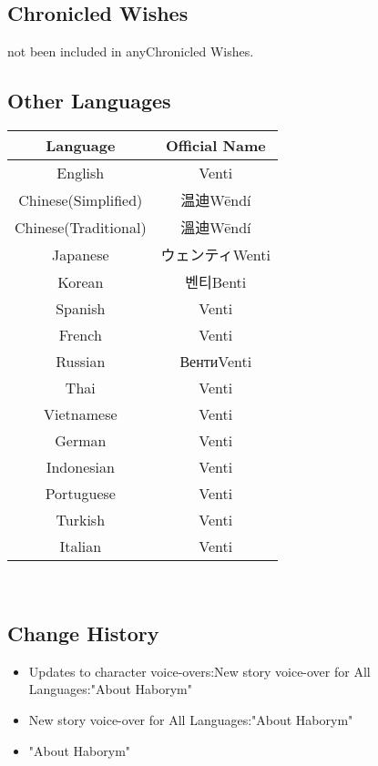 \documentclass[a4paper,12pt]{article}
\begin{document}
\subsection*{Chronicled Wishes}\n\nVentihas not been included in anyChronicled Wishes.\\ \par \vspace{0.5cm}

\subsection*{Other Languages}\n\n\begin{tabular}{|c|c|} \hline
Language & Official Name \\
 \hline
English & Venti \\
Chinese(Simplified) & 温迪Wēndí \\
Chinese(Traditional) & 溫迪Wēndí \\
Japanese & ウェンティWenti \\
Korean & 벤티Benti \\
Spanish & Venti \\
French & Venti \\
Russian & ВентиVenti \\
Thai & Venti \\
Vietnamese & Venti \\
German & Venti \\
Indonesian & Venti \\
Portuguese & Venti \\
Turkish & Venti \\
Italian & Venti \\
\end{tabular}\\ \par \vspace{0.5cm}

\subsection*{Change History}\n\n\begin{itemize}
\item Updates to character voice-overs:New story voice-over for All Languages:"About Haborym"
\item New story voice-over for All Languages:"About Haborym"
\item "About Haborym"
\end{itemize}\\ \par \vspace{0.5cm}
\end{document}
